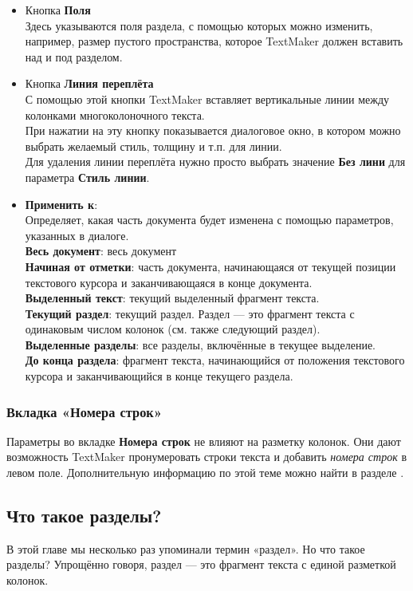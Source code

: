 ﻿\documentclass[a4paper,10pt]{article}
\begin{document}
\begin{itemize}
 \item Кнопка \textbf{Поля}\\
 Здесь указываются поля раздела, с помощью которых можно изменить, например, размер пустого пространства, которое TextMaker должен вставить над и под разделом.
 \item Кнопка \textbf{Линия переплёта}\\
 С помощью этой кнопки TextMaker вставляет вертикальные линии между колонками многоколоночного текста.\\
 При нажатии на эту кнопку показывается диалоговое окно, в котором можно выбрать желаемый стиль, толщину и т.п. для линии.\\
 Для удаления линии переплёта нужно просто выбрать значение \textbf{Без лини} для параметра \textbf{Стиль линии}.
 \item \textbf{Применить к}:\\
 Определяет, какая часть документа будет изменена с помощью параметров, указанных в диалоге.\\
 \textbf{Весь документ}: весь документ\\
 \textbf{Начиная от отметки}: часть документа, начинающаяся от текущей позиции текстового курсора и заканчивающаяся в конце документа.\\
 \textbf{Выделенный текст}: текущий выделенный фрагмент текста.\\
 \textbf{Текущий раздел}: текущий раздел. Раздел — это фрагмент текста с одинаковым числом колонок (см. также следующий раздел).\\
 \textbf{Выделенные разделы}: все разделы, включённые в текущее выделение.\\
 \textbf{До конца раздела}: фрагмент текста, начинающийся от положения текстового курсора и заканчивающийся в конце текущего раздела.
 \end{itemize}

 \subsubsection{Вкладка «Номера строк»}
 Параметры во вкладке \textbf{Номера строк} не влияют на разметку колонок. Они дают возможность TextMaker пронумеровать строки текста и добавить \textit{номера строк} в левом поле. Дополнительную информацию по этой теме можно найти в разделе .

\subsection{Что такое разделы?}
В  этой главе мы несколько раз упоминали термин «раздел». Но что такое разделы? Упрощённо говоря, раздел — это фрагмент текста с единой разметкой колонок. 
\end{document}
